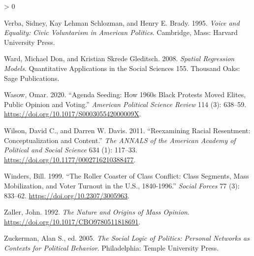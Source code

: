 \documentclass[
  12pt,
]{article}
\newlength{\cslhangindent}
\newenvironment{CSLReferences}[2] %
 {%
  \setlength{\parindent}{0pt}
  \ifodd #1 \everypar{\setlength{\hangindent}{\cslhangindent}}\ignorespaces\fi
  \ifnum #2 > 0
  \setlength{\parskip}{#2\baselineskip}
  \fi
 }%
 {}
\begin{document}
\begin{CSLReferences}{1}{0}
\leavevmode\hypertarget{ref-Verba1995}{}%
Verba, Sidney, Kay Lehman Schlozman, and Henry E. Brady. 1995. \emph{Voice and Equality: Civic Voluntarism in {American} Politics}. {Cambridge, Mass}: {Harvard University Press}.

\leavevmode\hypertarget{ref-Ward2008}{}%
Ward, Michael Don, and Kristian Skrede Gleditsch. 2008. \emph{Spatial Regression Models}. Quantitative Applications in the Social Sciences 155. {Thousand Oaks}: {Sage Publications}.

\leavevmode\hypertarget{ref-Wasow2020}{}%
Wasow, Omar. 2020. {``Agenda {Seeding}: {How} 1960s {Black Protests Moved Elites}, {Public Opinion} and {Voting}.''} \emph{American Political Science Review} 114 (3): 638--59. \url{https://doi.org/10.1017/S000305542000009X}.

\leavevmode\hypertarget{ref-Wilson2011}{}%
Wilson, David C., and Darren W. Davis. 2011. {``Reexamining {Racial Resentment}: {Conceptualization} and {Content}.''} \emph{The ANNALS of the American Academy of Political and Social Science} 634 (1): 117--33. \url{https://doi.org/10.1177/0002716210388477}.

\leavevmode\hypertarget{ref-Winders1999}{}%
Winders, Bill. 1999. {``The {Roller Coaster} of {Class Conflict}: {Class Segments}, {Mass Mobilization}, and {Voter Turnout} in the {U}.{S}., 1840-1996.''} \emph{Social Forces} 77 (3): 833--62. \url{https://doi.org/10.2307/3005963}.

\leavevmode\hypertarget{ref-Zaller1992}{}%
Zaller, John. 1992. \emph{The Nature and Origins of Mass Opinion}. \url{https://doi.org/10.1017/CBO9780511818691}.

\leavevmode\hypertarget{ref-Zuckerman2005}{}%
Zuckerman, Alan S., ed. 2005. \emph{The Social Logic of Politics: Personal Networks as Contexts for Political Behavior}. {Philadelphia}: {Temple University Press}.

\end{CSLReferences}
\end{document}

